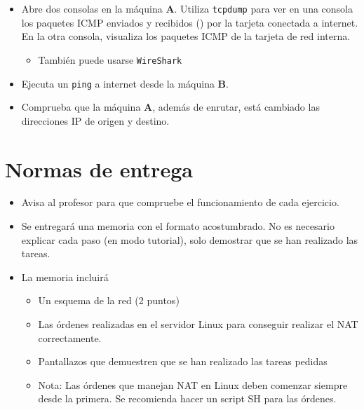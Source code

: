 \begin{homeworkProblem}
  \begin{itemize}
  \item Abre dos consolas en la máquina \textbf{A}. Utiliza \texttt{tcpdump} para ver en una consola los paquetes ICMP enviados y recibidos () por la tarjeta conectada a internet. En la otra consola, visualiza los paquetes ICMP de la tarjeta de red interna.
    \begin{itemize}
    \item También puede usarse \texttt{WireShark}
    \end{itemize}
  \item Ejecuta un \texttt{ping} a internet desde la máquina \textbf{B}.
  \item Comprueba que la máquina \textbf{A}, además de enrutar, está cambiado las direcciones IP de origen y destino.
  \end{itemize}
\end{homeworkProblem}


\section{Normas de entrega}
\begin{itemize}
\item Avisa al profesor para que compruebe el funcionamiento de cada ejercicio. 
\item Se entregará una memoria con el formato acostumbrado. No es necesario explicar cada paso (en modo tutorial), solo demostrar que se han realizado las tareas.
\item La memoria incluirá

  \begin{itemize}
  \item Un esquema de la red (2 puntos)
  \item Las órdenes realizadas en el servidor Linux para conseguir realizar el NAT correctamente.
  \item Pantallazos que demuestren que se han realizado las tareas pedidas
  \item
    \begin{small}
      Nota: Las órdenes que manejan NAT en Linux deben comenzar siempre desde la primera. Se recomienda hacer un script SH para las órdenes.
    \end{small}
    
  \end{itemize}

\end{itemize}


